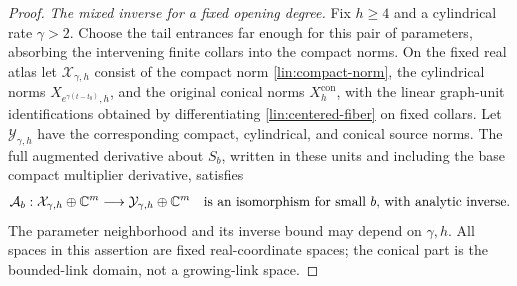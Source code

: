 \begin{proof}
\emph{The mixed inverse for a fixed opening degree.}
Fix $h\ge4$ and a cylindrical rate $\gamma>2$.  Choose the tail entrances
far enough for this pair of parameters, absorbing the intervening finite
collars into the compact norms.  On the fixed real atlas
let $\mathcal X_{\gamma,h}$ consist of the compact norm
\eqref{lin:compact-norm}, the cylindrical norms
$X_{e^{\gamma(t-t_0)},h}$, and the original conical norms
$X^{\mathrm{con}}_h$, with the linear graph-unit identifications obtained
by differentiating \eqref{lin:centered-fiber} on fixed collars.
Let $\mathcal Y_{\gamma,h}$ have the
corresponding compact, cylindrical, and conical source norms.
The full augmented derivative about $S_b$, written in these units and
including the base compact multiplier derivative, satisfies
\begin{equation}\label{lin:mixed-polynomial-inverse}
 \mathcal A_b:
 \mathcal X_{\gamma,h}\oplus\mathbb C^m
       \longrightarrow\mathcal Y_{\gamma,h}\oplus\mathbb C^m
 \quad\hbox{is an isomorphism for small $b$, with analytic inverse.}
\end{equation}
The parameter neighborhood and its inverse bound may depend on
$\gamma,h$.  All spaces in this assertion are fixed real-coordinate
spaces; the conical part is the bounded-link domain, not a growing-link
space.


\end{proof}
